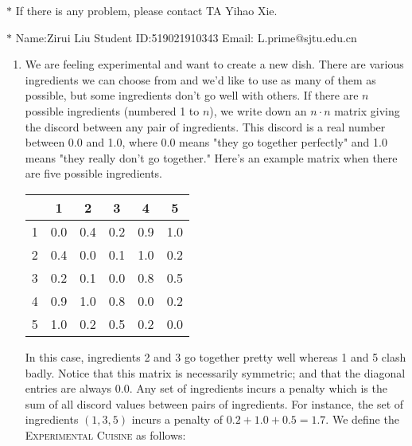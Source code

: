 \documentclass[12pt,a4paper]{article}
\theoremstyle{definition}
\begin{document}
\noindent

\noindent{}
\begin{center}
\footnotesize{\color{red}$*$ If there is any problem, please contact TA Yihao Xie. }

\footnotesize{\color{blue}$*$ Name:Zirui Liu  \quad Student ID:519021910343 \quad Email: L.prime@sjtu.edu.cn}
\end{center}

\begin{enumerate}
    \item We are feeling experimental and want to create a new dish. There are various ingredients we can choose from and we'd like to use as many of them as possible, but some ingredients don't go well with others. If there are $n$ possible ingredients (numbered 1 to $n$), we write down an $n\cdot n$ matrix giving the discord between any pair of ingredients. This discord is a real number between 0.0 and 1.0, where 0.0 means "they go together perfectly" and 1.0 means "they really don't go together." Here's an example matrix when there are five possible ingredients.
    \begin{center}
        \begin{tabular}{|c|ccccc|}
        \hline
             & 1  & 2 & 3 & 4 & 5\\
        \hline
            1 & 0.0 & 0.4 & 0.2 & 0.9 & 1.0\\
            2 & 0.4 & 0.0 & 0.1 & 1.0 & 0.2\\
            3 & 0.2 & 0.1 & 0.0 & 0.8 & 0.5\\
            4 & 0.9 & 1.0 & 0.8 & 0.0 & 0.2\\
            5 & 1.0 & 0.2 & 0.5 & 0.2 & 0.0\\
        \hline
        \end{tabular}
    \end{center}
    In this case, ingredients 2 and 3 go together pretty well whereas 1 and 5 clash badly. Notice that this matrix is necessarily symmetric; and that the diagonal entries are always 0.0. Any set of ingredients incurs a penalty which is the sum of all discord values between pairs of ingredients. For instance, the set of ingredients $(1,3,5)$ incurs a penalty of $0.2+1.0+0.5 = 1.7$. We define the \textsc{Experimental Cuisine} as follows:


\end{enumerate}
\end{document}
